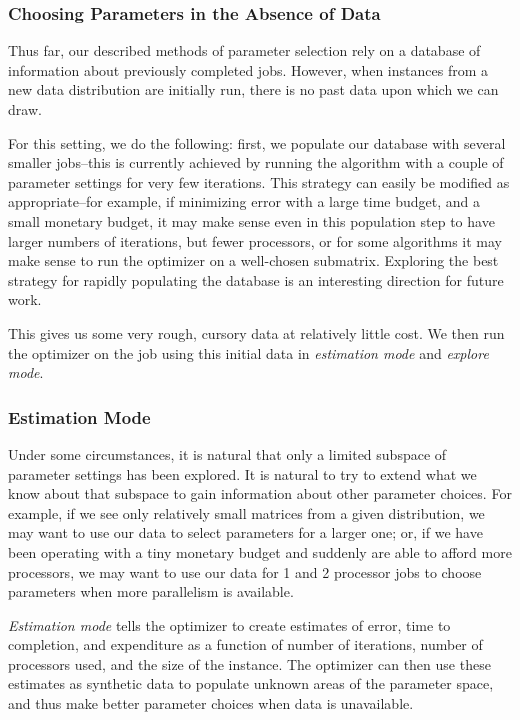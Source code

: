 \subsubsection{Choosing Parameters in the Absence of Data}
\label{sec:nodata}

Thus far, our described methods of parameter selection rely on a database
of information about previously completed jobs. However, when instances
from a new data distribution are initially run, there is no past data upon
which we can draw.

For this setting, we do the following: first, we populate our database 
with several smaller jobs--this is currently achieved by running the 
algorithm with a couple of parameter settings for very few iterations. 
This strategy can easily be modified as appropriate--for example, if
minimizing error with a large time budget, and a small monetary budget, 
it may make sense even in this population step 
to have larger numbers of iterations, but fewer processors, or for some
algorithms it may make sense to run the optimizer on a well-chosen 
submatrix. Exploring the best strategy for rapidly populating the database
is an interesting direction for future work.

This gives us some very rough, cursory data at relatively 
little cost. We then run the optimizer on the job using this initial data
in {\em estimation mode} and {\em explore mode}.

\subsubsection{Estimation Mode}
\label{sec:estimate}
Under some circumstances, it is natural that only a limited subspace
of parameter settings has been explored. It is natural to try to extend
what we know about that subspace to gain information about other parameter
choices. For example, if we see only
relatively small matrices from a given distribution, we may want to use
our data to select parameters for a larger one; or, if we have been
operating with a tiny monetary budget and suddenly are able to afford
more processors, we may want to use our data for 1 and 2 processor
jobs to choose parameters when more parallelism is available. 

{\em Estimation mode} tells the optimizer to create estimates of error, time to completion, and expenditure as a function of number of 
iterations, number of processors used, and the size of the instance. The 
optimizer can then use these estimates as synthetic data to populate
unknown areas of the parameter space, and thus make better parameter
choices when data is unavailable. 

